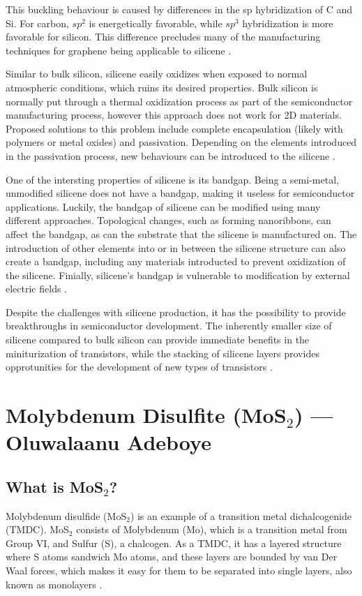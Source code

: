 \documentclass[conference]{IEEEtran}
\begin{document}
This buckling behaviour is caused by differences in the sp hybridization of C and Si. For carbon, $sp^2$ is energetically favorable, while $sp^3$ hybridization is more favorable for silicon. This difference precludes many of the manufacturing techniques for graphene being applicable to silicene \cite{oc1}.

Similar to bulk silicon, silicene easily oxidizes when exposed to normal atmospheric conditions, which ruins its desired properties. Bulk silicon is normally put through a thermal oxidization process as part of the semiconductor manufacturing process, however this approach does not work for 2D materials. Proposed solutions to this problem include complete encapsulation (likely with polymers or metal oxides) and passivation. Depending on the elements introduced in the passivation process, new behaviours can be introduced to the silicene \cite{oc2}.

One of the intersting properties of silicene is its bandgap. Being a semi-metal, unmodified silicene does not have a bandgap, making it useless for semiconductor applications. Luckily, the bandgap of silicene can be modified using many different approaches. Topological changes, such as forming nanoribbons, can affect the bandgap, as can the substrate that the silicene is manufactured on. The introduction of other elements into or in between the silicene structure can also create a bandgap, including any materials introducted to prevent oxidization of the silicene. Finially, silicene's bandgap is vulnerable to modification by external electric fields \cite{oc2}.

Despite the challenges with silicene production, it has the possibility to provide breakthroughs in semiconductor development. The inherently smaller size of silicene compared to bulk silicon can provide immediate benefits in the miniturization of transistors, while the stacking of silicene layers provides opprotunities for the development of new types of transistors \cite{oc2,oc1}.

\section{Molybdenum Disulfite (MoS$_2$) — Oluwalaanu Adeboye}

\subsection{What is MoS$_2$?}

Molybdenum disulfide (MoS$_2$) is an example of a transition metal dichalcogenide (TMDC). MoS$_2$ consists of Molybdenum (Mo), which is a transition metal from Group VI, and Sulfur (S), a chalcogen. As a TMDC, it has a layered structure where S atoms sandwich Mo atoms, and these layers are bounded by van Der Waal forces, which makes it easy for them to be separated into single layers, also known as monolayers \cite{oa1}. 
\end{document}
